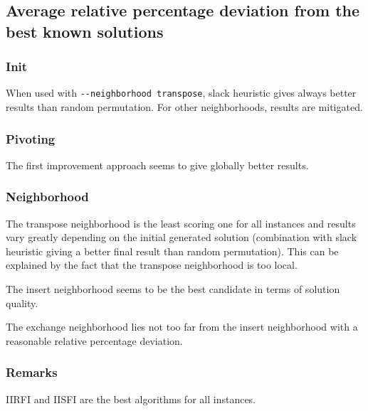 \subsection{Average relative percentage deviation from the best known solutions}

\subsubsection{Init}

When used with \verb!--neighborhood transpose!, slack heuristic gives always better results than random permutation. For other neighborhoods, results are mitigated.

\subsubsection{Pivoting}

The first improvement approach seems to give globally better results.

\subsubsection{Neighborhood}

The transpose neighborhood is the least scoring one for all instances and results vary greatly depending on the initial generated solution (combination with slack heuristic giving a better final result than random permutation). This can be explained by the fact that the transpose neighborhood is too local.

The insert neighborhood seems to be the best candidate in terms of solution quality.

The exchange neighborhood lies not too far from the insert neighborhood with a reasonable relative percentage deviation.



\subsubsection{Remarks}

IIRFI and IISFI are the best algorithms for all instances.